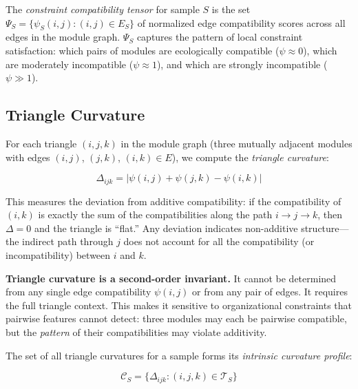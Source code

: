 \documentclass{../yalumba}
\begin{document}
\begin{definition}
The \emph{constraint compatibility tensor} for sample $S$ is the set
$\Psi_S = \{\psi_S(i,j) : (i,j) \in E_S\}$ of normalized edge
compatibility scores across all edges in the module graph.  $\Psi_S$
captures the pattern of local constraint satisfaction: which pairs of
modules are ecologically compatible ($\psi \approx 0$), which are
moderately incompatible ($\psi \approx 1$), and which are strongly
incompatible ($\psi \gg 1$).
\end{definition}

\subsection{Triangle Curvature}

For each triangle $(i,j,k)$ in the module graph (three mutually adjacent
modules with edges $(i,j)$, $(j,k)$, $(i,k) \in E$), we compute the
\emph{triangle curvature}:

\begin{equation}
  \Delta_{ijk} = |\psi(i,j) + \psi(j,k) - \psi(i,k)|
  \label{eq:triangle-curvature}
\end{equation}

This measures the deviation from additive compatibility: if the
compatibility of $(i,k)$ is exactly the sum of the compatibilities along
the path $i \to j \to k$, then $\Delta = 0$ and the triangle is
``flat.''  Any deviation indicates non-additive structure---the indirect
path through $j$ does not account for all the compatibility (or
incompatibility) between $i$ and $k$.


\begin{keyfinding}
\textbf{Triangle curvature is a second-order invariant.}  It cannot be
determined from any single edge compatibility $\psi(i,j)$ or from any
pair of edges.  It requires the full triangle context.  This makes it
sensitive to organizational constraints that pairwise features cannot
detect: three modules may each be pairwise compatible, but the
\emph{pattern} of their compatibilities may violate additivity.
\end{keyfinding}

The set of all triangle curvatures for a sample forms its \emph{intrinsic
curvature profile}:

\begin{equation}
  \mathcal{C}_S = \{\Delta_{ijk} : (i,j,k) \in \mathcal{T}_S\}
  \label{eq:curvature-profile}
\end{equation}
\end{document}
